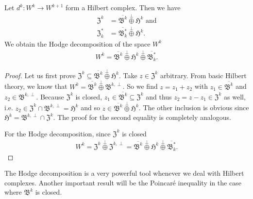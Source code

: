 \documentclass[../master_thesis.tex]{subfiles}
\begin{document}
\begin{theorem}\label{thm:hodge_decomposition}
    Let $d^k: W^k \rightarrow W^{k+1}$ form a Hilbert complex. 
    Then we have
    \begin{align*}
        \mathfrak{Z}^k &= \overline{\mathfrak{B}^k} \stackrel{\perp}{\oplus}
            \mathfrak{H}^k \text{ and}
        \\ \mathfrak{Z}^*_k &= 
            \overline{\mathfrak{B}^*_k} \stackrel{\perp}{\oplus}
            \mathfrak{H}^k.
    \end{align*}
    We obtain the Hodge decomposition of the space $W^k$
    \begin{align*}
        W^k = \overline{\mathfrak{B}^k} \stackrel{\perp}{\oplus}
            \mathfrak{H}^k \stackrel{\perp}{\oplus} \overline{\mathfrak{B}^*_k}.
    \end{align*}
\end{theorem}
\begin{proof}
    Let us first prove $\mathfrak{Z}^k \subseteq 
    \overline{\mathfrak{B}^k} \stackrel{\perp}{\oplus} \mathfrak{H}^k$.
    Take $z \in \mathfrak{Z}^k$ arbitrary. 
    From basic Hilbert theory, we know that 
    $W^k = \overline{\mathfrak{B}^k} \stackrel{\perp}{\oplus} 
    \mathfrak{B}^{k,\perp}$. So we find $z = z_1 + z_2$ with
    $z_1 \in \overline{\mathfrak{B}^k}$ and $z_2 \in 
    \mathfrak{B}^{k,\perp}$. 
    Because $\mathfrak{Z}^k$ is closed,
    $z_1 \in \overline{\mathfrak{B}^k} \subseteq \mathfrak{Z}^k$ 
    and thus $z_2 = z - z_1 \in \mathfrak{Z}^k$ as well, i.e. $z_2 \in \mathfrak{Z}^k 
    \cap \mathfrak{B}^{k,\perp} = \mathfrak{H}^k$ and so 
    $z \in \overline{\mathfrak{B}^k} \stackrel{\perp}{\oplus}
    \mathfrak{H}^k$. The other inclusion is obvious since 
    $\mathfrak{H}^k = \mathfrak{B}^{k,\perp} \cap \mathfrak{Z}^k$.
    The proof for the second equality is completely analogous. 

    For the Hodge decomposition, since $\mathfrak{Z}^k$ is closed 
    \begin{align*}
        W^k = \mathfrak{Z}^k \stackrel{\perp}{\oplus} \mathfrak{Z}^{k,\perp}
        =  \overline{\mathfrak{B}^k} \stackrel{\perp}{\oplus}
            \mathfrak{H}^k \stackrel{\perp}{\oplus} \overline{\mathfrak{B}^*_k}.
    \end{align*}
\end{proof}
The Hodge decomposition is a very powerful tool whenever we deal with Hilbert
complexes. Another important result will be the Poincaré inequality 
in the case where $\mathfrak{B}^k$ is closed.
\end{document}
